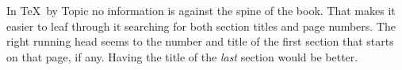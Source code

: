 In \TeX\ by Topic no information is against the spine of the
book. That makes it easier to leaf through it searching for both
section titles and page numbers.
The right running head seems to the number and title of the first
section that starts on that page, if any. Having the title of the
\emph{last} section would be better.
